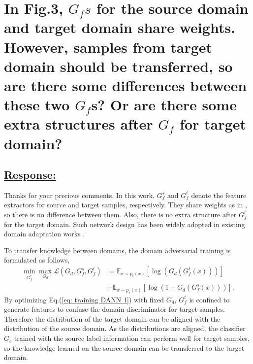 

\section{In Fig.3, $G_fs$ for the source domain and target domain share weights.
However, samples from target domain should be transferred, so are there some differences between these two $G_f$s?
Or are there some extra structures after $G_f$ for target domain?}
\subsection*{\underline{\textbf{Response:}}}

Thanks for your precious comments.
In this work, $G_f^s$ and $G_f^t$ denote the feature extractors for source and target samples, respectively. They share weights as in \cite{OpensetDA-bp}, so there is no difference between them. 
Also, there is no extra structure after $G_f^t$ for the target domain.
Such network design has been widely adopted in existing domain adaptation works \cite{OpensetDA-bp,PartialDA-tf,UniversalDomainAdaptation}.

To transfer knowledge between domains, the domain adversarial training is formulated as follows,
\begin{equation}
    \label{eq: training DANN 1}
    \begin{split}
        \min_{G_f^t} \max_{G_d} \mathscr{L}(G_d,G^{s}_{f},G_f^t) &=\mathbb{E}_{x\sim p_t(x)} \left[ \log \left(G_d\left(G_f^t\left(x\right)\right)\right) \right]\\
        &+\mathbb{E}_{x\sim p_s(x)}\left[ \log \left(1-G_d\left(G_f^s\left(x\right)\right)\right) \right].
    \end{split}
\end{equation}
By optimizing Eq.(\ref{eq: training DANN 1}) with fixed $G_d$, $G_f^t$ is confined to generate features to confuse the domain discriminator for target samples.
Therefore the distribution of the target domain can be aligned with the distribution of the source domain.
As the distributions are aligned, the classifier $G_c$ trained with the source label information can perform well for target samples, so the knowledge learned on the source domain can be transferred to the target domain.


